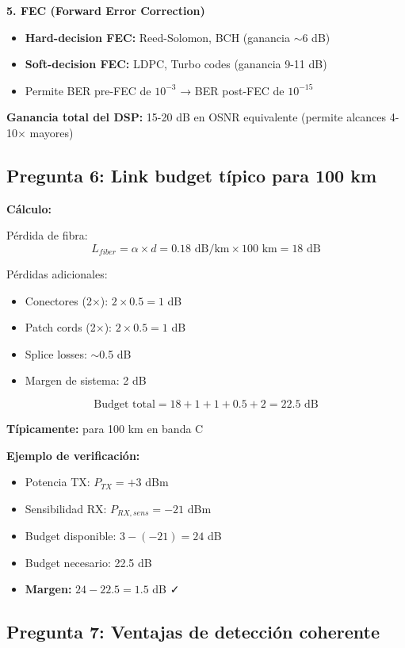 \documentclass[a4paper,10pt]{article}
\begin{document}
\textbf{5. FEC (Forward Error Correction)}
\begin{itemize}
    \item \textbf{Hard-decision FEC:} Reed-Solomon, BCH (ganancia $\sim$6 dB)
    \item \textbf{Soft-decision FEC:} LDPC, Turbo codes (ganancia 9-11 dB)
    \item Permite BER pre-FEC de $10^{-3}$ → BER post-FEC de $10^{-15}$
\end{itemize}

\textbf{Ganancia total del DSP:} 15-20 dB en OSNR equivalente (permite alcances 4-10× mayores)

\subsection{Pregunta 6: Link budget típico para 100 km}

\textbf{Cálculo:}

Pérdida de fibra:
$$L_{fiber} = \alpha \times d = 0.18 \text{ dB/km} \times 100 \text{ km} = 18 \text{ dB}$$

Pérdidas adicionales:
\begin{itemize}
    \item Conectores (2×): $2 \times 0.5 = 1$ dB
    \item Patch cords (2×): $2 \times 0.5 = 1$ dB
    \item Splice losses: $\sim$0.5 dB
    \item Margen de sistema: 2 dB
\end{itemize}

$$\boxed{\text{Budget total} = 18 + 1 + 1 + 0.5 + 2 = 22.5 \text{ dB}}$$

\textbf{Típicamente:}  para 100 km en banda C

\textbf{Ejemplo de verificación:}
\begin{itemize}
    \item Potencia TX: $P_{TX} = +3$ dBm
    \item Sensibilidad RX: $P_{RX,sens} = -21$ dBm
    \item Budget disponible: $3 - (-21) = 24$ dB
    \item Budget necesario: 22.5 dB
    \item \textbf{Margen:} $24 - 22.5 = 1.5$ dB ✓
\end{itemize}

\subsection{Pregunta 7: Ventajas de detección coherente}
\end{document}

